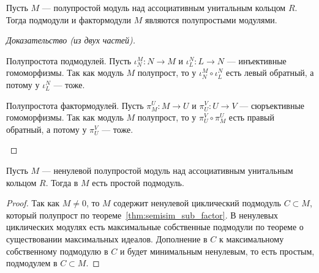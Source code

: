 \documentclass[
	extrafontsizes,
	11pt,
	hyphens,
]{memoir}
\begin{document}
\begin{theorem}\label{thm:semisim_sub_factor}
Пусть \(M\) --- полупростой модуль над ассоциативным унитальным кольцом \(R\). Тогда подмодули и фактормодули \(M\) являются полупростыми модулями.
\end{theorem}

\begin{proof}[Доказательство (из двух частей)]
~\begin{proofdescription}

\item[Полупростота подмодулей.]
Пусть \(\iota_N^M : N \to M\) и \(\iota_L^N : L \to N\) --- инъективные гомоморфизмы. Так как модуль \(M\) полупрост, то у \(\iota_N^M \circ \iota_L^N\) есть левый обратный, а потому у \(\iota_L^N\) --- тоже.

\item[Полупростота фактормодулей.]
Пусть \(\pi_M^U : M \to U\) и \(\pi_U^V : U \to V\) --- сюръективные гомоморфизмы. Так как модуль \(M\) полупрост, то у \(\pi_U^V \circ \pi_M^U\) есть правый обратный, а потому у \(\pi_U^V\) --- тоже.
\qedhere

\end{proofdescription}
\end{proof}

\begin{lemma}\label{lem:prime_submodule_in_semisimple}
Пусть \(M\) --- ненулевой полупростой модуль над ассоциативным унитальным кольцом \(R\). Тогда в \(M\) есть простой подмодуль.
\end{lemma}

\begin{proof}
Так как \(M \neq 0\), то \(M\) содержит ненулевой циклический подмодуль \(C \subset M\), который полупрост по теореме~\ref{thm:semisim_sub_factor}.
В ненулевых циклических модулях есть максимальные собственные подмодули по теореме о существовании максимальных идеалов.
Дополнение в \(C\) к максимальному собственному подмодулю в \(C\) и будет минимальным ненулевым, то есть простым, подмодулем в \(C \subset M\).
\end{proof}

\end{document}
